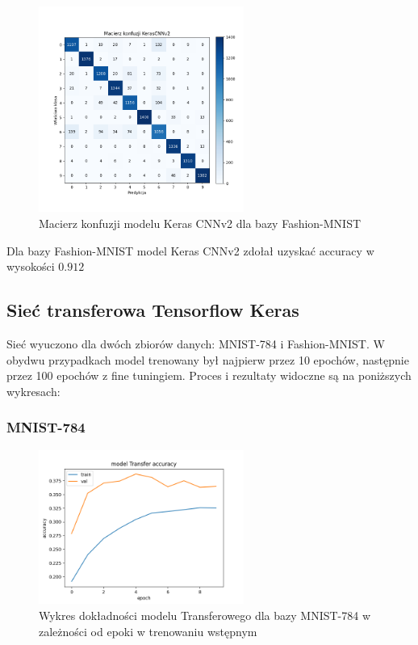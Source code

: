\documentclass{article}
\begin{document}
\begin{figure}[H]
	\centering
	\includegraphics[width=0.6\textwidth]{../Saves/KerasCNNV2/fashion-mnist/KerasCNNV2_fashion-mnist_conf_mat.png}
	\caption{Macierz konfuzji modelu Keras CNNv2 dla bazy Fashion-MNIST}
\end{figure}
Dla bazy Fashion-MNIST model Keras CNNv2 zdołał uzyskać accuracy w wysokości $0.912$


\subsection{Sieć transferowa Tensorflow Keras}
Sieć wyuczono dla dwóch zbiorów danych: MNIST-784 i Fashion-MNIST. W obydwu 
przypadkach model trenowany był najpierw przez 10 epochów, następnie 
przez 100 epochów z fine tuningiem. Proces i rezultaty widoczne są na poniższych wykresach:

\subsubsection{MNIST-784}
\begin{figure}[H]
    \centering
    \includegraphics[width=0.6\textwidth]{../Saves/Transfer/mnist-784/Transfer_mnist_784_ep10_acc.png}
    \caption{Wykres dokładności modelu Transferowego dla bazy MNIST-784 w zależności od epoki w trenowaniu wstępnym}
\end{figure}
\end{document}
